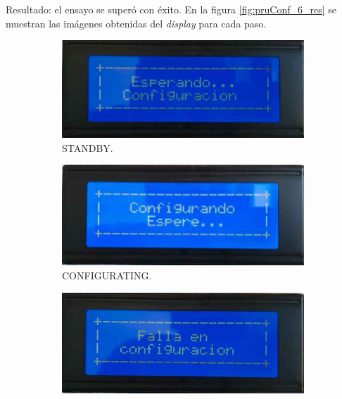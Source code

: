 Resultado: el ensayo se superó con éxito. En la figura \ref{fig:pruConf_6_res} se muestran las imágenes obtenidas del \textit{display} para cada paso.

\begin{figure}[!htpb]
     \centering
     \begin{subfigure}[b]{0.4\textwidth}
         \centering
         \includegraphics[width=1.1\textwidth]{./Figures/Esp_Conf.jpeg}
         \caption{STANDBY.}
         \label{fig:pruConf_6_1}
     \end{subfigure}
           \hfill
     \begin{subfigure}[b]{0.4\textwidth}
         \centering
         \includegraphics[width=1.1\textwidth]{./Figures/Conf_esp.jpeg}
         \caption{CONFIGURATING.}
         \label{fig:pruConf_6_2}
     \end{subfigure}
           \hfill
     \begin{subfigure}[b]{0.4\textwidth}
         \centering
         \includegraphics[width=1.1\textwidth]{./Figures/Falla_conf.jpeg}

\end{subfigure}
\end{figure}

